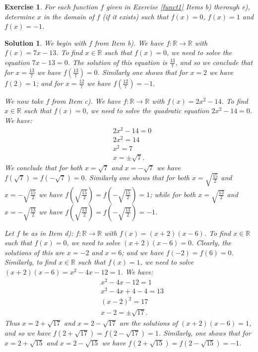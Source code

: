 \documentclass[12pt]{article}
\newtheorem{ex}{Exercise}[section]
\newtheorem{sol}[prop]{Solution}
\begin{document}
\begin{ex}
For each function $f$ given in Exercise \ref{funct1} Items b) therough e), determine $x$ in the domain of $f$ (if it exists) such that $f(x)=0$, $f(x)=1$ and $f(x)=-1$.
\end{ex}

\begin{sol}
We begin with $f$ from Item b). We have $f:\mathbb{R}\to\mathbb{R}$ with $f(x)=7x-13$. To find $x\in \mathbb{R}$ such that $f(x)=0$, we need to solve the equation $7x-13=0$. The solution of this equation is $\frac{13}{7}$, and so we conclude that for $x=\frac{13}{7}$ we have $f(\frac{13}{7})=0$. Similarly one shows that for $x=2$ we have $f(2)=1$; and for $x=\frac{12}{7}$ we have $f(\frac{12}{7})=-1$.

We now take $f$ from Item c). We have $f:\mathbb{R}\to\mathbb{R}$ with $f(x)=2x^{2}-14$. To find $x\in \mathbb{R}$ such that $f(x)=0$, we need to solve the quadratic equation $2x^{2}-14=0$. We have:
\begin{equation*}
\begin{split}
&2x^{2}-14=0 \\
& 2x^{2}=14\\
& x^{2}=7\\
& x=\pm \sqrt{7}.
\end{split}
\end{equation*}
We conclude that for both $x=\sqrt{7}$ and $x=-\sqrt{7}$ we have $f(\sqrt{7})=f(-\sqrt{7})=0$. Similarly one shows that for both $x=\sqrt{\frac{15}{2}}$ and $x=-\sqrt{\frac{15}{2}}$ we have $f(\sqrt{\frac{15}{2}})=f(-\sqrt{\frac{15}{2}})=1$; while for both $x=\sqrt{\frac{13}{2}}$ and $x=-\sqrt{\frac{13}{2}}$ we have $f(\sqrt{\frac{13}{2}})=f(-\sqrt{\frac{13}{2}})=-1$.
 
Let $f$ be as in Item d): $f:\mathbb{R}\to\mathbb{R}$ with $f(x)=(x+2)(x-6)$. To find $x\in \mathbb{R}$ such that $f(x)=0$, we need to solve $(x+2)(x-6)=0$. Clearly, the solutions of this are $x=-2$ and $x=6$; and we have $f(-2)=f(6)=0$. Similarly, to find $x\in \mathbb{R}$ such that $f(x)=1$, we need to solve $(x+2)(x-6)=x^{2}-4x-12=1$. We have:
\begin{equation*}
\begin{split}
&x^{2}-4x-12=1\\
& x^{2}-4x+4-4=13\\
& (x-2)^{2}=17\\
& x-2=\pm\sqrt{17}.
\end{split}
\end{equation*}
Thus $x=2+\sqrt{17}$ and $x=2-\sqrt{17}$ are the solutions of $(x+2)(x-6)=1$, and so we have $f(2+\sqrt{17})=f(2-\sqrt{17})=1$. Similarly, one shows that for $x=2+\sqrt{15}$ and $x=2-\sqrt{15}$ we have $f(2+\sqrt{15})=f(2-\sqrt{15})=-1$. 


\end{sol}
\end{document}

